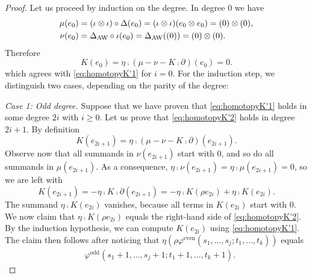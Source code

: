 {\begin{proof}
 	Let us proceed by induction on the degree. In degree $0$ we have
    \begin{align*}
        \mu(e_0) &= (\iota\otimes \iota)\circ \Delta(e_0) = (\iota\otimes \iota)(e_0\otimes e_0) = (0)\otimes (0),\\
        \nu(e_0) &= \Delta_{\operatorname{AW}}\circ \iota(e_0) = \Delta_{\operatorname{AW}}((0)) = (0)\otimes (0).
    \end{align*}
	Therefore
	\[
	K(e_0) = \eta \comp (\mu-\nu-K \comp \partial)(e_0) = 0.
	\]
	which agrees with \eqref{eq:homotopyK'1} for $i=0$. For the induction step, we distinguish two cases, depending on the parity of the degree:

 \medskip
    
    \noindent\emph{Case 1: Odd degree.} Suppose that we have proven that \eqref{eq:homotopyK'1} holds in some degree $2i$ with $i\geq 0$. Let us prove that \eqref{eq:homotopyK'2} holds in degree $2i+1$. By definition
	\[K(e_{2i+1}) = \eta \comp (\mu-\nu-K \comp \partial)(e_{2i+1}).\]
	Observe now that all summands in $\nu(e_{2i+1})$ start with $0$, and so do all summands in $\mu(e_{2i+1})$. As a consequence, $\eta \comp \nu(e_{2i+1}) = \eta \comp \mu(e_{2i+1}) = 0$, so we are left with
	\[K(e_{2i+1}) = -\eta \comp K \comp \partial(e_{2i+1}) = -\eta \comp K (\rho e_{2i}) + \eta \comp K (e_{2i}).
	\]
	The summand $\eta \comp K (e_{2i})$ vanishes, because all terms in $K(e_{2i})$ start with $0$. We now claim that $\eta \comp K (\rho e_{2i})$ equals the right-hand side of \eqref{eq:homotopyK'2}. By the induction hypothesis, we can compute $K(e_{2i})$ using \eqref{eq:homotopyK'1}. The claim then follows after noticing that $\eta(\rho\varphi^{\mathrm{even}}(s_1,\ldots,s_j;t_1,\ldots,t_k))$ equals
 \begin{align*}
      &\varphi^{\mathrm{odd}}(s_1+1,\ldots,s_j+1;t_1+1,\ldots,t_k+1).
\end{align*}

\medskip
    

\end{proof}}
